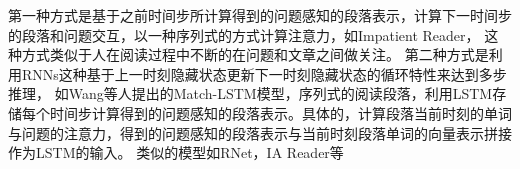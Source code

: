 第一种方式是基于之前时间步所计算得到的问题感知的段落表示，计算下一时间步的段落和问题交互，以一种序列式的方式计算注意力，如Impatient Reader，
这种方式类似于人在阅读过程中不断的在问题和文章之间做关注。
%
第二种方式是利用RNNs这种基于上一时刻隐藏状态更新下一时刻隐藏状态的循环特性来达到多步推理，
如Wang等人提出的Match-LSTM模型，序列式的阅读段落，利用LSTM存储每个时间步计算得到的问题感知的段落表示。具体的，计算段落当前时刻的单词与问题的注意力，得到的问题感知的段落表示与当前时刻段落单词的向量表示拼接作为LSTM的输入。
类似的模型如RNet，IA Reader等
%

